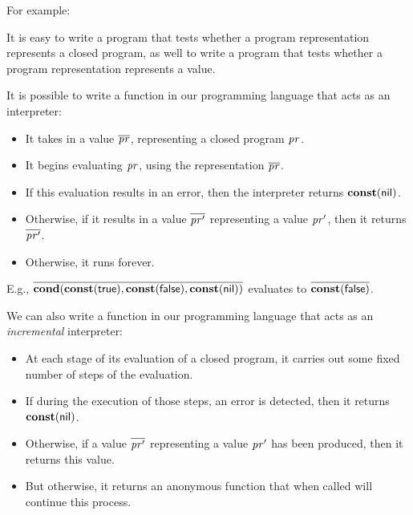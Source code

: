 For example:


It is easy to write a program that tests whether a program
representation represents a closed program, as well to write a program
that tests whether a program representation represents a value.

It is possible to write a function in our programming language that
%
acts as an interpreter:
\begin{itemize}
\item It takes in a value $\overline{\mathit{pr}}$, representing a closed
  program $\mathit{pr}$.

\item It begins evaluating $\mathit{pr}$, using the representation
  $\overline{\mathit{pr}}$.

\item If this evaluation results in an error, then the interpreter
  returns $\mathbf{const}(\mathsf{nil})$.

\item Otherwise, if it results in a value $\overline{\mathit{pr}'}$
  representing a value $\mathit{pr}'$, then it returns $\overline{\mathit{pr}'}$.

\item Otherwise, it runs forever.
\end{itemize}

E.g.,
  $\overline{\mathbf{cond}(\mathbf{const}(\mathsf{true}),\mathbf{const}(\mathsf{false}),
    \mathbf{const}(\mathsf{nil}))}$ evaluates to $\overline{\mathbf{const}(\mathsf{false})}$.

We can also write a function in our programming language that acts as
%
an \emph{incremental} interpreter:
\begin{itemize}
\item At each stage of its evaluation of a closed program, it carries
  out some fixed number of steps of the evaluation.

\item If during the execution of those steps, an error is detected,
  then it returns $\mathbf{const}(\mathsf{nil})$.

\item Otherwise, if a value $\overline{\mathit{pr}'}$ representing a value
  $\mathit{pr}'$ has been produced, then it returns this value.

\item But otherwise, it returns an anonymous function that when called
  will continue this process.
\end{itemize}

